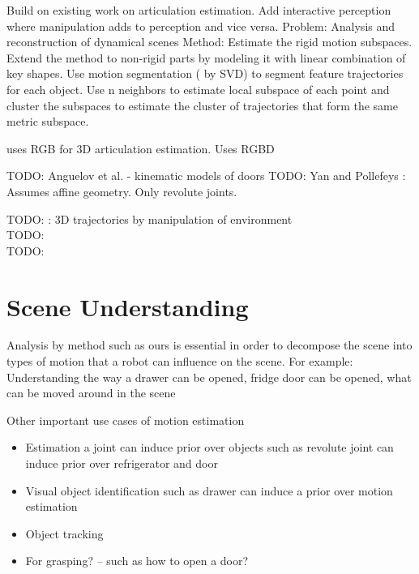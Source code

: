 \documentclass[conference]{IEEEtran}
\begin{document}
\cite{martin2014online} Build on existing work on articulation estimation. Add interactive perception where manipulation adds to perception and vice versa.
  \cite{yan2006automatic} 
    Problem: Analysis and reconstruction of dynamical scenes
    Method: Estimate the rigid motion subspaces. Extend the method to non-rigid
    parts by modeling it with linear combination of key shapes. Use motion
    segmentation ( by SVD) to segment feature trajectories for each object. Use
    n neighbors to estimate local subspace of each point and cluster the
    subspaces to estimate the cluster of trajectories that form the same metric subspace.

    \cite{katz2010interactive} uses RGB for 3D articulation estimation.
    \cite{katz2013interactive} Uses RGBD

 
TODO: Anguelov et al. - kinematic models of doors
TODO: Yan and Pollefeys : Assumes affine geometry. Only revolute joints.


TODO: \cite{sturm20103d} : 3D trajectories by manipulation of environment \\
TODO: \cite{huang2012occlusion} \\ 
TODO: \cite{Pillai-RSS-14} \\



\section{Scene Understanding}
Analysis by method such as ours is essential in order to decompose the scene into types of motion that a robot can influence on the scene.
For example: Understanding the way a drawer can be opened, fridge door can be opened, what can be moved around in the scene

Other important use cases of motion estimation
\begin{itemize}
\item Estimation a joint can induce prior over objects such as revolute joint can induce prior over refrigerator and door
\item Visual object identification such as drawer can induce a prior over motion estimation
\item Object tracking 
\item For grasping? -- such as how to open a door?
\end{itemize}
\end{document}
